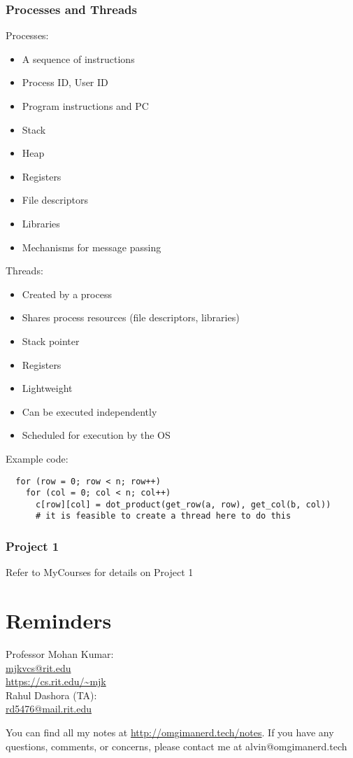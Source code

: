 \documentclass{math}
\begin{document}
\subsubsection*{Processes and Threads}
Processes:
\begin{itemize}
  \item A sequence of instructions
  \item Process ID, User ID
  \item Program instructions and PC
  \item Stack
  \item Heap
  \item Registers
  \item File descriptors
  \item Libraries
  \item Mechanisms for message passing
\end{itemize}
Threads:
\begin{itemize}
  \item Created by a process
  \item Shares process resources (file descriptors, libraries)
  \item Stack pointer
  \item Registers
  \item Lightweight
  \item Can be executed independently
  \item Scheduled for execution by the OS
\end{itemize}
Example code:
\begin{lstlisting}
  for (row = 0; row < n; row++)
    for (col = 0; col < n; col++)
      c[row][col] = dot_product(get_row(a, row), get_col(b, col))
      # it is feasible to create a thread here to do this
\end{lstlisting}

\subsubsection*{Project 1}
Refer to MyCourses for details on Project 1

\section*{Reminders}
Professor Mohan Kumar: \\
\url{mjkvcs@rit.edu} \\
\url{https://cs.rit.edu/~mjk} \\

\noindent Rahul Dashora (TA): \\
\url{rd5476@mail.rit.edu} \\

\begin{center}
  You can find all my notes at \url{http://omgimanerd.tech/notes}. If you have
  any questions, comments, or concerns, please contact me at
  alvin@omgimanerd.tech
\end{center}
\end{document}
